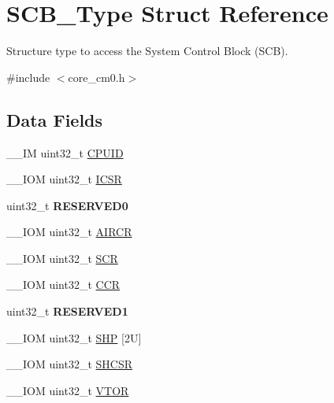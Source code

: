 \hypertarget{struct_s_c_b___type}{}\section{S\+C\+B\+\_\+\+Type Struct Reference}
\label{struct_s_c_b___type}


Structure type to access the System Control Block (S\+CB).  




{\ttfamily \#include $<$core\+\_\+cm0.\+h$>$}

\subsection*{Data Fields}
\begin{DoxyCompactItemize}
\item 
\+\_\+\+\_\+\+IM uint32\+\_\+t \hyperlink{struct_s_c_b___type_adbf8292503748ba6421a523bdee6819d}{C\+P\+U\+ID}
\item 
\+\_\+\+\_\+\+I\+OM uint32\+\_\+t \hyperlink{struct_s_c_b___type_aced895d6aba03d72b0d865fcc5ce44ee}{I\+C\+SR}
\item 
\mbox{\label{struct_s_c_b___type_af86c61a5d38a4fc9cef942a12744486b}} 
uint32\+\_\+t {\bfseries R\+E\+S\+E\+R\+V\+E\+D0}
\item 
\+\_\+\+\_\+\+I\+OM uint32\+\_\+t \hyperlink{struct_s_c_b___type_a9b6ccd9c0c0865f8facad77ea37240b0}{A\+I\+R\+CR}
\item 
\+\_\+\+\_\+\+I\+OM uint32\+\_\+t \hyperlink{struct_s_c_b___type_acac65f229cb3fcb5369a0a9e0393b8c0}{S\+CR}
\item 
\+\_\+\+\_\+\+I\+OM uint32\+\_\+t \hyperlink{struct_s_c_b___type_ad68b5c1f2d9845ef4247cf2d9b041336}{C\+CR}
\item 
\mbox{\label{struct_s_c_b___type_ac4ac04e673b5b8320d53f7b0947db902}} 
uint32\+\_\+t {\bfseries R\+E\+S\+E\+R\+V\+E\+D1}
\item 
\+\_\+\+\_\+\+I\+OM uint32\+\_\+t \hyperlink{struct_s_c_b___type_aa043193516e3fc0abbf58ce7cf8cfb4e}{S\+HP} \mbox{[}2\+U\mbox{]}
\item 
\+\_\+\+\_\+\+I\+OM uint32\+\_\+t \hyperlink{struct_s_c_b___type_a44ad5c292dbd77e72f310902375a8a06}{S\+H\+C\+SR}
\item 
\+\_\+\+\_\+\+I\+OM uint32\+\_\+t \hyperlink{struct_s_c_b___type_ae457d2615e203c3d5904a43a1bc9df71}{V\+T\+OR}
\item 

\end{DoxyCompactItemize}
